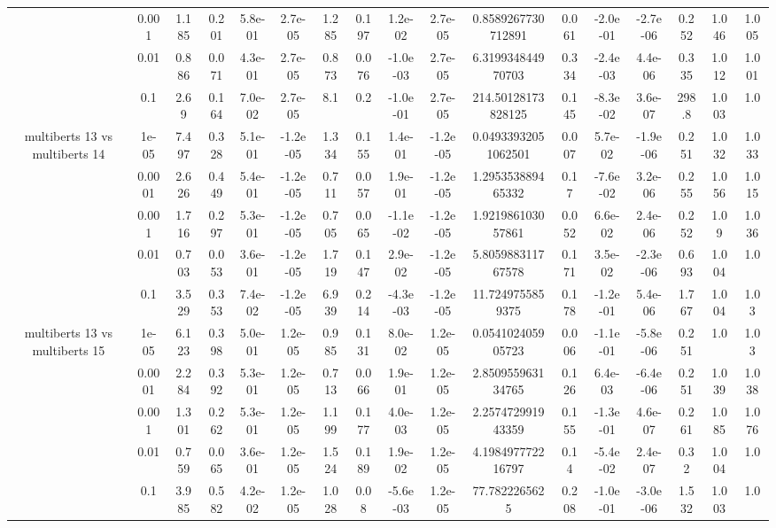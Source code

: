 \begin{tabular}{|c|c|c|c|c|c|c|c|c|c|c|c|c|c|c|c|c|}
 & 0.001 & 1.185 & 0.201 & 5.8e-01 & 2.7e-05 & 1.285 & 0.197 & 1.2e-02 & 2.7e-05 & 0.8589267730712891 & 0.061 & -2.0e-01 & -2.7e-06 & 0.252 & 1.046 & 1.005 \\
 & 0.01 & 0.886 & 0.071 & 4.3e-01 & 2.7e-05 & 0.873 & 0.076 & -1.0e-03 & 2.7e-05 & 6.319934844970703 & 0.334 & -2.4e-03 & 4.4e-06 & 0.335 & 1.012 & 1.001 \\
 & 0.1 & 2.69 & 0.164 & 7.0e-02 & 2.7e-05 & 8.1 & 0.2 & -1.0e-01 & 2.7e-05 & 214.50128173828125 & 0.145 & -8.3e-02 & 3.6e-07 & 298.8 & 1.003 & 1.0 \\
\hline
\multirow{5}{*}{multiberts 13 vs multiberts 14} & 1e-05 & 7.497 & 0.328 & 5.1e-01 & -1.2e-05 & 1.334 & 0.155 & 1.4e-01 & -1.2e-05 & 0.04933932051062501 & 0.007 & 5.7e-02 & -1.9e-06 & 0.251 & 1.032 & 1.033 \\
 & 0.0001 & 2.626 & 0.449 & 5.4e-01 & -1.2e-05 & 0.711 & 0.057 & 1.9e-01 & -1.2e-05 & 1.295353889465332 & 0.17 & -7.6e-02 & 3.2e-06 & 0.255 & 1.056 & 1.015 \\
 & 0.001 & 1.716 & 0.297 & 5.3e-01 & -1.2e-05 & 0.705 & 0.065 & -1.1e-02 & -1.2e-05 & 1.921986103057861 & 0.052 & 6.6e-02 & 2.4e-06 & 0.252 & 1.09 & 1.036 \\
 & 0.01 & 0.703 & 0.053 & 3.6e-01 & -1.2e-05 & 1.719 & 0.147 & 2.9e-02 & -1.2e-05 & 5.805988311767578 & 0.171 & 3.5e-02 & -2.3e-06 & 0.693 & 1.004 & 1.0 \\
 & 0.1 & 3.529 & 0.353 & 7.4e-02 & -1.2e-05 & 6.939 & 0.214 & -4.3e-03 & -1.2e-05 & 11.7249755859375 & 0.178 & -1.2e-01 & 5.4e-06 & 1.767 & 1.004 & 1.03 \\
\hline
\multirow{5}{*}{multiberts 13 vs multiberts 15} & 1e-05 & 6.123 & 0.398 & 5.0e-01 & 1.2e-05 & 0.985 & 0.131 & 8.0e-02 & 1.2e-05 & 0.054102405905723 & 0.006 & -1.1e-01 & -5.8e-06 & 0.251 & 1.0 & 1.03 \\
 & 0.0001 & 2.284 & 0.392 & 5.3e-01 & 1.2e-05 & 0.713 & 0.066 & 1.9e-01 & 1.2e-05 & 2.850955963134765 & 0.126 & 6.4e-03 & -6.4e-06 & 0.251 & 1.039 & 1.038 \\
 & 0.001 & 1.301 & 0.262 & 5.3e-01 & 1.2e-05 & 1.199 & 0.177 & 4.0e-03 & 1.2e-05 & 2.257472991943359 & 0.155 & -1.3e-01 & 4.6e-07 & 0.261 & 1.085 & 1.076 \\
 & 0.01 & 0.759 & 0.065 & 3.6e-01 & 1.2e-05 & 1.524 & 0.189 & 1.9e-02 & 1.2e-05 & 4.198497772216797 & 0.14 & -5.4e-02 & 2.4e-07 & 0.32 & 1.004 & 1.0 \\
 & 0.1 & 3.985 & 0.582 & 4.2e-02 & 1.2e-05 & 1.028 & 0.08 & -5.6e-03 & 1.2e-05 & 77.7822265625 & 0.208 & -1.0e-01 & -3.0e-06 & 1.532 & 1.003 & 1.0 \\

\end{tabular}
